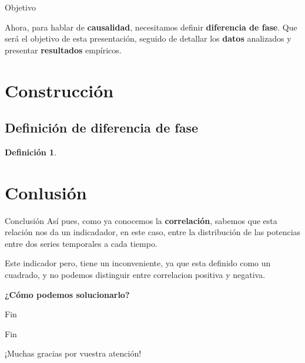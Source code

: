 \documentclass[11pt]{beamer}
\newtheorem{definicion}{Definición}[section]
\begin{document}
	
    \begin{frame}{Objetivo}

	Ahora, para hablar de \textbf{causalidad}, necesitamos definir \textbf{diferencia de fase}. Que será el objetivo de esta presentación, seguido de detallar los \textbf{datos} analizados y presentar \textbf{resultados} empíricos.

    \end{frame}


\section{Construcción}
    \subsection{Definición de diferencia de fase}
    
	\begin{frame}
	    \begin{definicion}

	    \end{definicion}
	 \end{frame}



    \section{Conlusión}
    \begin{frame}{Conclusión}
        Así pues, como ya conocemos la \textbf{correlación}, sabemos que esta relación nos da un indicadador, en este caso, entre la distribución de las potencias entre dos series temporales a cada tiempo.
        
        \vspace{3mm}
        Este indicador pero, tiene un inconveniente, ya que esta definido como un cuadrado, y {\color{red} no podemos distinguir entre correlacion positiva y negativa}.

        \vspace{3mm}
        \begin{center}
        {\large \textbf{¿Cómo podemos solucionarlo?}}
        \end{center}
    \end{frame}

    \begin{frame}{Fin}
    \begin{center}
        {\huge Fin}
        
        \vspace{5mm}
        {\large ¡Muchas gracias por vuestra atención!}
    \end{center}
    \end{frame}
\end{document}
